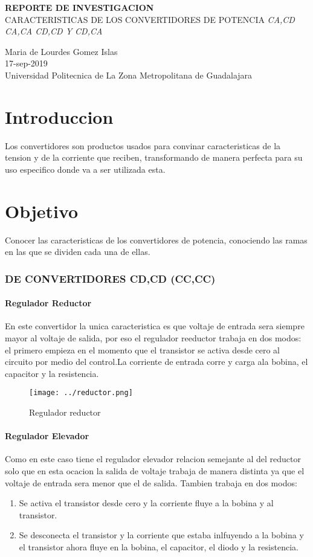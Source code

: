 \documentclass[11pt,a4paper]{article}
\begin{document}
\begin{center}
\textbf{REPORTE DE INVESTIGACION}\\
CARACTERISTICAS DE LOS CONVERTIDORES DE POTENCIA
\emph{CA,CD CA,CA CD,CD Y CD,CA}
\end{center}

\begin{center}
Maria de Lourdes Gomez Islas\\
17-sep-2019\\
Universidad Politecnica de La Zona Metropolitana de Guadalajara
\end{center}

\part{Introduccion}
Los convertidores son productos usados para convinar caracteristicas de la tension y de la corriente que reciben, transformando de manera perfecta para su uso especifico donde va a ser utilizada esta.
\part{Objetivo}
Conocer las caracteristicas de los convertidores de potencia, conociendo las ramas en las que se dividen cada una de ellas.

\section{DE CONVERTIDORES CD,CD (CC,CC)}
 
\subsection{Regulador Reductor}
En este convertidor la unica caracteristica es que voltaje de entrada sera siempre mayor al voltaje de salida, por eso el regulador reeductor trabaja en dos modos: el  primero  empieza  en  el  momento  que  el  transistor  se  activa desde cero al  circuito  por  medio    del control.La corriente de entrada corre y carga ala bobina, el capacitor y la resistencia.

\begin{figure}[h]
\centering
\texttt{[image: ../reductor.png]} 
\caption{Regulador reductor}
\end{figure}

\subsection{Regulador Elevador}
Como en este caso tiene el regulador elevador relacion semejante al del reductor solo que en esta ocacion la salida de voltaje trabaja de manera distinta ya que el voltaje de entrada sera menor que el de salida. Tambien trabaja en dos modos:\begin{enumerate}
\item Se activa el transistor desde cero y la corriente fluye a la bobina y al transistor.
\item Se desconecta el transistor y la corriente que estaba inlfuyendo a la bobina y el transistor ahora fluye en la bobina, el capacitor, el diodo y la resistencia. 
\end{enumerate} 
\end{document}
